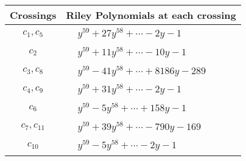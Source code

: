 \documentclass[1p]{elsarticle_modified}
\theoremstyle{definition}
\begin{document}
\begin{tabular}{m{50pt}|m{274pt}}
Crossings & \hspace{64pt}Riley Polynomials at each crossing \\
\hline $$\begin{aligned}c_{1},c_{5}\end{aligned}$$&$\begin{aligned}
&y^{59}+27 y^{58}+\cdots-2 y-1
\end{aligned}$\\
\hline $$\begin{aligned}c_{2}\end{aligned}$$&$\begin{aligned}
&y^{59}+11 y^{58}+\cdots-10 y-1
\end{aligned}$\\
\hline $$\begin{aligned}c_{3},c_{8}\end{aligned}$$&$\begin{aligned}
&y^{59}-41 y^{58}+\cdots+8186 y-289
\end{aligned}$\\
\hline $$\begin{aligned}c_{4},c_{9}\end{aligned}$$&$\begin{aligned}
&y^{59}+31 y^{58}+\cdots-2 y-1
\end{aligned}$\\
\hline $$\begin{aligned}c_{6}\end{aligned}$$&$\begin{aligned}
&y^{59}-5 y^{58}+\cdots+158 y-1
\end{aligned}$\\
\hline $$\begin{aligned}c_{7},c_{11}\end{aligned}$$&$\begin{aligned}
&y^{59}+39 y^{58}+\cdots-790 y-169
\end{aligned}$\\
\hline $$\begin{aligned}c_{10}\end{aligned}$$&$\begin{aligned}
&y^{59}-5 y^{58}+\cdots-2 y-1
\end{aligned}$\\
\hline
\end{tabular}
\vskip 2pc
\end{document}
